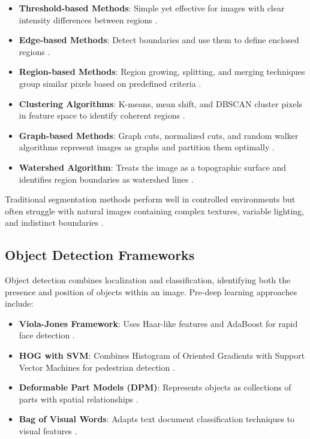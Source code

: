 \begin{itemize}
    \item \textbf{Threshold-based Methods}: Simple yet effective for images with clear intensity differences between regions \cite{otsu1979threshold}.
    
    \item \textbf{Edge-based Methods}: Detect boundaries and use them to define enclosed regions \cite{canny1986computational}.
    
    \item \textbf{Region-based Methods}: Region growing, splitting, and merging techniques group similar pixels based on predefined criteria \cite{adams1994seeded}.
    
    \item \textbf{Clustering Algorithms}: K-means, mean shift, and DBSCAN cluster pixels in feature space to identify coherent regions \cite{comaniciu2002mean}.
    
    \item \textbf{Graph-based Methods}: Graph cuts, normalized cuts, and random walker algorithms represent images as graphs and partition them optimally \cite{boykov2001interactive}.
    
    \item \textbf{Watershed Algorithm}: Treats the image as a topographic surface and identifies region boundaries as watershed lines \cite{beucher1993morphological}.
\end{itemize}

Traditional segmentation methods perform well in controlled environments but often struggle with natural images containing complex textures, variable lighting, and indistinct boundaries \cite{pal1993review}.

\subsection{Object Detection Frameworks}
Object detection combines localization and classification, identifying both the presence and position of objects within an image. Pre-deep learning approaches include:

\begin{itemize}
    \item \textbf{Viola-Jones Framework}: Uses Haar-like features and AdaBoost for rapid face detection \cite{viola2001rapid}.
    
    \item \textbf{HOG with SVM}: Combines Histogram of Oriented Gradients with Support Vector Machines for pedestrian detection \cite{dalal2005histograms}.
    
    \item \textbf{Deformable Part Models (DPM)}: Represents objects as collections of parts with spatial relationships \cite{felzenszwalb2009object}.
    
    \item \textbf{Bag of Visual Words}: Adapts text document classification techniques to visual features \cite{csurka2004visual}.
\end{itemize}

